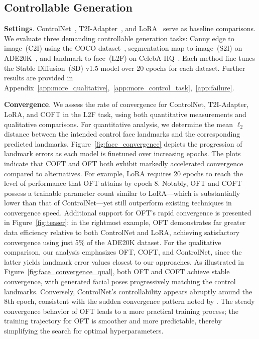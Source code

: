\subsection{Controllable Generation}

\textbf{Settings}. ControlNet~\cite{zhang2023adding}, T2I-Adapter~\cite{mou2023t2i}, and LoRA~\cite{hulora2022} serve as baseline comparisons. We evaluate three demanding controllable generation tasks: Canny edge to image~(C2I) using the COCO dataset~\cite{lin2014microsoft}, segmentation map to image~(S2I) on ADE20K~\cite{zhou2017scene}, and landmark to face~(L2F) on CelebA-HQ~\cite{karras2018progressive,xia2021tedigan}. Each method fine-tunes the Stable Diffusion~(SD) v1.5 model over 20 epochs for each dataset. Further results are provided in Appendix~\ref{app:more_qualitative},~\ref{app:more_control_task},~\ref{app:failure}.

\textbf{Convergence}. We assess the rate of convergence for ControlNet, T2I-Adapter, LoRA, and COFT in the L2F task, using both quantitative measurements and qualitative comparisons. For quantitative analysis, we determine the mean $\ell_2$ distance between the intended control face landmarks and the corresponding predicted landmarks. Figure~\ref{fig:face_convergence} depicts the progression of landmark errors as each model is finetuned over increasing epochs. The plots indicate that COFT and OFT both exhibit markedly accelerated convergence compared to alternatives. For example, LoRA requires 20 epochs to reach the level of performance that OFT attains by epoch 8. Notably, OFT and COFT possess a trainable parameter count similar to LoRA—which is substantially lower than that of ControlNet—yet still outperform existing techniques in convergence speed. Additional support for OFT’s rapid convergence is presented in Figure~\ref{fig:teaser}: in the rightmost example, OFT demonstrates far greater data efficiency relative to both ControlNet and LoRA, achieving satisfactory convergence using just 5\% of the ADE20K dataset. For the qualitative comparison, our analysis emphasizes OFT, COFT, and ControlNet, since the latter yields landmark error values closest to our approaches. As illustrated in Figure~\ref{fig:face_convergence_qual}, both OFT and COFT achieve stable convergence, with generated facial poses progressively matching the control landmarks. Conversely, ControlNet’s controllability appears abruptly around the 8th epoch, consistent with the sudden convergence pattern noted by \cite{zhang2023adding}. The steady convergence behavior of OFT leads to a more practical training process; the training trajectory for OFT is smoother and more predictable, thereby simplifying the search for optimal hyperparameters.

